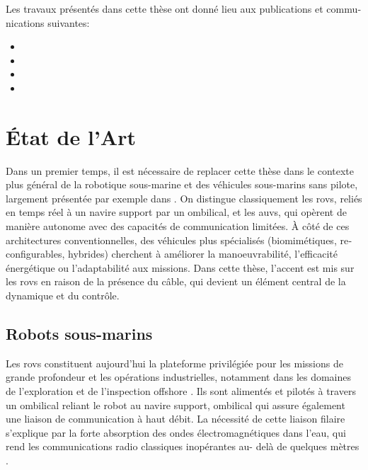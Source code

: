 \begin{otherlanguage}{french}
	Les travaux présentés dans cette thèse ont donné lieu aux publications et communications suivantes:

	\begin{itemize}
		\item \AtNextCite{\setcounter{maxnames}{99}}
		\item \AtNextCite{\setcounter{maxnames}{99}}
		\item \AtNextCite{\setcounter{maxnames}{99}}
		\item \AtNextCite{\setcounter{maxnames}{99}}
	\end{itemize}

	\section{État de l'Art}
	\label{sif_state_of_the_art}

	Dans un premier temps, il est nécessaire de replacer cette thèse dans le contexte plus général de
	la robotique sous-marine et des véhicules sous-marins sans pilote, largement présentée par exemple
	dans \textcite{creuzeRobotsMarinsSousmarins2014}. On distingue classiquement les \acp{rov}, reliés
	en temps réel à un navire support par un ombilical, et les \acp{auv}, qui opèrent de manière
	autonome avec des capacités de communication limitées. À côté de ces architectures
	conventionnelles, des véhicules plus spécialisés (biomimétiques, reconfigurables, hybrides)
	cherchent à améliorer la manoeuvrabilité, l'efficacité énergétique ou l'adaptabilité aux missions.
	Dans cette thèse, l'accent est mis sur les \acp{rov} en raison de la présence du câble, qui devient
	un élément central de la dynamique et du contrôle.

	\subsection{Robots sous-marins}
	\label{sif_sota_rov}

	Les \acp{rov} constituent aujourd'hui la plateforme privilégiée pour les missions de grande
	profondeur et les opérations industrielles, notamment dans les domaines de l'exploration et de
	l'inspection offshore \parencite{christROVManualUser2013}. Ils sont alimentés et pilotés à travers
	un ombilical reliant le robot au navire support, ombilical qui assure également une liaison de
	communication à haut débit. La nécessité de cette liaison filaire s'explique par la forte
	absorption des ondes électromagnétiques dans l'eau, qui rend les communications radio classiques
	inopérantes au- delà de quelques mètres
	\parencite{downingOpticalConstantsWater1975,rothmanHITRAN2004Molecular2005,altgeltWorldsLargestRadiostation2005}.


\end{otherlanguage}
